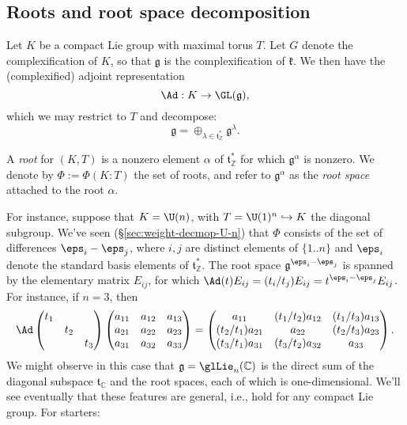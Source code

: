 \documentclass[reqno]{amsart} 
\begin{document}
\subsection{Roots and root space decomposition}\label{sec:cnh2voumpl}
Let $K$ be a compact Lie group with maximal torus $T$.  Let $G$ denote the complexification of $K$, so that $\mathfrak{g}$ is the complexification of $\mathfrak{k}$.  We then have the (complexified) adjoint representation
\begin{equation*}
  \Ad : K \rightarrow \GL(\mathfrak{g}),
\end{equation*}
which we may restrict to $T$ and decompose:
\begin{equation}\label{eq:decmopose-Ad-g-into-weightspaces}
  \mathfrak{g} =
  \oplus_{\lambda \in \mathfrak{t}_{\mathbb{Z}}^*}
  \mathfrak{g}^{\lambda}.
\end{equation}

\begin{definition}
  A \emph{root} for $(K,T)$ is a nonzero element $\alpha$ of $\mathfrak{t}_{\mathbb{Z}}^*$ for which $\mathfrak{g}^{\alpha}$ is nonzero.  We denote by $\Phi := \Phi(K:T)$ the set of roots, and refer to $\mathfrak{g}^{\alpha}$ as the \emph{root space} attached to the root $\alpha$.
\end{definition}

For instance, suppose that $K = \U(n)$, with $T = \U(1)^n \hookrightarrow K$ the diagonal subgroup.  We've seen (\S\ref{sec:weight-decmop-U-n}) that $\Phi$ consists of the set of differences $\eps_i - \eps_j$, where $i,j$ are distinct elements of $\{1..n\}$ and $\eps_i$ denote the standard basis elements of $\mathfrak{t}_{\mathbb{Z}}^*$.  The root space $\mathfrak{g}^{\eps_i-\eps_j}$ is spanned by the elementary matrix $E_{i j}$, for which $\Ad(t) E_{i j} = (t_i / t_j) E_{i j} = t^{\eps_i - \eps_j} E_{i j}$.  For instance, if $n = 3$, then
\begin{equation*}
  \Ad 
\begin{pmatrix}
    t_1 &  &  \\
    & t_2 &  \\
    & & t_3
  \end{pmatrix}
  \begin{pmatrix}
    a_{11} & a _{12} &  a _{13} \\
    a _{21} & a _{22} & a _{23} \\
    a _{31} & a _{32} & a _{33}
  \end{pmatrix}
  =
  \begin{pmatrix}
    a_{11} & (t_1/t_2) a _{12} &  (t_1/t_3)a _{13} \\
    (t_2/t_1) a _{21} & a _{22} & (t_2/t_3) a _{23} \\
    (t_3/t_1) a _{31} & (t_3/t_2) a _{32} & a _{33}
  \end{pmatrix}
.
\end{equation*}
We might observe in this case that $\mathfrak{g} = \glLie_n(\mathbb{C})$ is the direct sum of the diagonal subspace $\mathfrak{t}_{\mathbb{C}}$ and the root spaces, each of which is one-dimensional.  We'll see eventually that these features are general, i.e., hold for any compact Lie group.  For starters:
\end{document}
